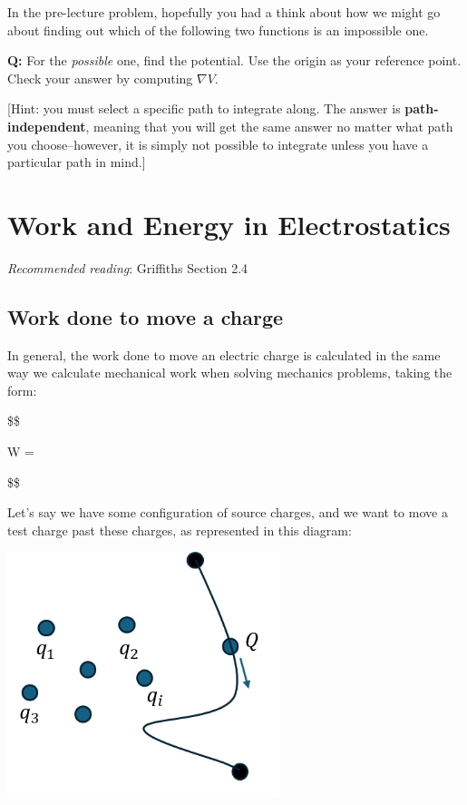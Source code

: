 \documentclass[
  letterpaper,
  DIV=11,
  numbers=noendperiod]{scrreprt}
\begin{document}
In the pre-lecture problem, hopefully you had a think about how we might
go about finding out which of the following two functions is an
impossible one.

\textbf{Q:} For the \emph{possible} one, find the potential. Use the
origin as your reference point. Check your answer by computing
\(\nabla V\).

{[}Hint: you must select a specific path to integrate along. The answer
is \textbf{path-independent}, meaning that you will get the same answer
no matter what path you choose--however, it is simply not possible to
integrate unless you have a particular path in mind.{]}


\chapter{Work and Energy in
Electrostatics}\label{work-and-energy-in-electrostatics}

\newcommand{\l}{\mathrm{\mathbf{l}}}
\newcommand{\E}{\mathrm{\mathbf{E}}}
\newcommand{\F}{\mathrm{\mathbf{F}}}
\newcommand{\r}{\mathrm{\mathbf{r}}}

\newcommand{\x}{\mathrm{\mathbf{x}}}
\newcommand{\y}{\mathrm{\mathbf{y}}}
\newcommand{\z}{\mathrm{\mathbf{z}}}
\newcommand{\p}{\mathrm{\mathbf{p}}}
\newcommand{\d}{\mathrm{\mathbf{d}}}

\newcommand{\a}{\mathrm{\mathbf{a}}}
\newcommand{\b}{\mathrm{\mathbf{b}}}

\emph{Recommended reading}: Griffiths Section 2.4

\section{Work done to move a charge}\label{work-done-to-move-a-charge}

In general, the work done to move an electric charge is calculated in
the same way we calculate mechanical work when solving mechanics
problems, taking the form:

\$\$

W = \int {} \cdot {}  

\$\$

Let's say we have some configuration of source charges, and we want to
move a test charge past these charges, as represented in this diagram:

\includegraphics[width=3.125in,height=\textheight]{Figures/workdone_charge.png}
\end{document}
